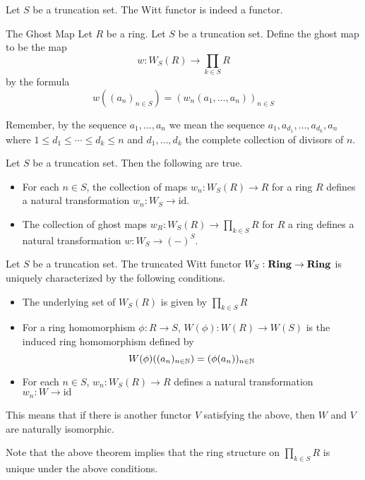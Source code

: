 \documentclass[a4paper]{article}
\begin{document}
\begin{prp}{}{} Let $S$ be a truncation set. The Witt functor is indeed a functor. 
\end{prp}

\begin{defn}{The Ghost Map}{} Let $R$ be a ring. Let $S$ be a truncation set. Define the ghost map to be the map $$w:W_S(R)\to\prod_{k\in S}R$$ by the formula $$w((a_n)_{n\in S})=(w_n(a_1,\dots,a_n))_{n\in S}$$
\end{defn}

Remember, by the sequence $a_1,\dots,a_n$ we mean the sequence $a_1,a_{d_1},\dots,a_{d_k},a_n$ where $1\leq d_1\leq\cdots\leq d_k\leq n$ and $d_1,\dots,d_k$ the complete collection of divisors of $n$. 

\begin{prp}{}{} Let $S$ be a truncation set. Then the following are true. 
\begin{itemize}
\item For each $n\in S$, the collection of maps $w_n:W_S(R)\to R$ for a ring $R$ defines a natural transformation $w_n:W_S\rightarrow\text{id}$. 
\item The collection of ghost maps $w_R:W_S(R)\to\prod_{k\in S}R$ for $R$ a ring defines a natural transformation $w:W_S\rightarrow (-)^S$. 
\end{itemize}
\end{prp}

\begin{prp}{}{} Let $S$ be a truncation set. The truncated Witt functor $W_S:\bold{Ring}\to\bold{Ring}$ is uniquely characterized by the following conditions. 
\begin{itemize}
\item The underlying set of $W_S(R)$ is given by $\prod_{k\in S}R$
\item For a ring homomorphism $\phi:R\to S$, $W(\phi):W(R)\to W(S)$ is the induced ring homomorphism defined by $$W(\phi)((a_n)_{n\in\mathbb{N}})=(\phi(a_n))_{n\in\mathbb{N}}$$
\item For each $n\in S$, $w_n:W_S(R)\to R$ defines a natural transformation $w_n:W\rightarrow\text{id}$
\end{itemize}
This means that if there is another functor $V$ satisfying the above, then $W$ and $V$ are naturally isomorphic. 
\end{prp}

Note that the above theorem implies that the ring structure on $\prod_{k\in S}R$ is unique under the above conditions. 
\end{document}

